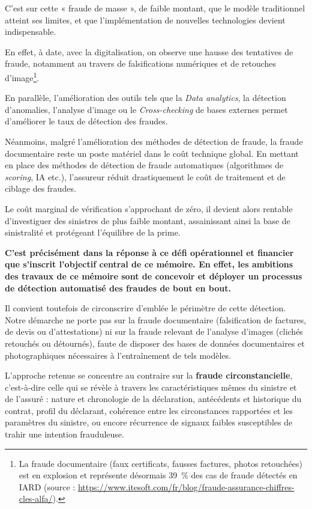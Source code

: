 C'est sur cette « fraude de masse », de faible montant, que le modèle traditionnel atteint ses limites, et que l'implémentation de nouvelles technologies devient indispensable.

En effet, à date, avec la digitalisation, on observe une hausse des tentatives de fraude, notamment au travers de falsifications numériques et de retouches d'image\footnote{La fraude documentaire (faux certificats, fausses factures, photos retouchées) est en explosion et représente désormais 39~\% des cas de fraude détectés en IARD (source : \url{https://www.itesoft.com/fr/blog/fraude-assurance-chiffres-cles-alfa/}).}.

En parallèle, l'amélioration des outils tels que la \textit{Data analytics}, la détection d'anomalies, l'analyse d'image ou le \textit{Cross-checking} de bases externes permet d'améliorer le taux de détection des fraudes.

Néanmoins, malgré l'amélioration des méthodes de détection de fraude, la fraude documentaire reste un poste matériel dans le coût technique global. En mettant en place des méthodes de détection de fraude automatiques (algorithmes de \textit{scoring}, IA etc.), l'assureur réduit drastiquement le coût de traitement et de ciblage des fraudes.

Le coût marginal de vérification s'approchant de zéro, il devient alors rentable d'investiguer des sinistres de plus faible montant, assainissant ainsi la base de sinistralité et protégeant l'équilibre de la prime.

\textbf{C'est précisément dans la réponse à ce défi opérationnel et financier que s'inscrit l'objectif central de ce mémoire. En effet, les ambitions des travaux de ce mémoire sont de concevoir et déployer un processus de détection automatisé des fraudes de bout en bout.}

Il convient toutefois de circonscrire d'emblée le périmètre de cette détection. Notre démarche ne porte pas sur la fraude documentaire (falsification de factures, de devis ou d'attestations) ni sur la fraude relevant de l'analyse d'images (clichés retouchés ou détournés), faute de disposer des bases de données documentaires et photographiques nécessaires à l'entraînement de tels modèles.

L'approche retenue se concentre au contraire sur la \textbf{fraude circonstancielle}, c'est-à-dire celle qui se révèle à travers les caractéristiques mêmes du sinistre et de l'assuré : nature et chronologie de la déclaration, antécédents et historique du contrat, profil du déclarant, cohérence entre les circonstances rapportées et les paramètres du sinistre, ou encore récurrence de signaux faibles susceptibles de trahir une intention frauduleuse.

